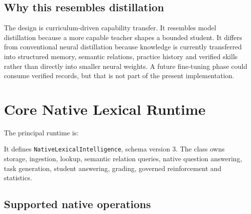 \documentclass[11pt,a4paper]{article}
\begin{document}
\subsection{Why this resembles distillation}

The design is curriculum-driven capability transfer. It resembles model distillation because
a more capable teacher shapes a bounded student. It differs from conventional neural
distillation because knowledge is currently transferred into structured memory, semantic
relations, practice history and verified skills rather than directly into smaller neural
weights. A future fine-tuning phase could consume verified records, but that is not part of
the present implementation.

\section{Core Native Lexical Runtime}

The principal runtime is:

\begin{quote}
\end{quote}

It defines \texttt{NativeLexicalIntelligence}, schema version 3. The class owns storage,
ingestion, lookup, semantic relation queries, native question answering, task generation,
student answering, grading, governed reinforcement and statistics.

\subsection{Supported native operations}
\end{document}
